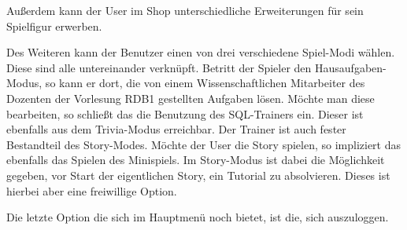 Au{\ss}erdem kann der User im Shop unterschiedliche Erweiterungen f\"ur sein Spielfigur erwerben.

Des Weiteren kann der Benutzer einen von drei verschiedene Spiel-Modi w\"ahlen. Diese sind alle untereinander verkn\"upft. Betritt der Spieler den 
Hausaufgaben-Modus, so kann er dort, die von einem Wissenschaftlichen Mitarbeiter des Dozenten der Vorlesung RDB1 gestellten Aufgaben l\"osen. 
M\"ochte man diese bearbeiten, so schlie{\ss}t das die Benutzung des SQL-Trainers ein. Dieser ist ebenfalls aus dem Trivia-Modus erreichbar. Der Trainer
ist auch fester Bestandteil des Story-Modes. M\"ochte der User die Story spielen, so impliziert das ebenfalls das Spielen des Minispiels.
Im Story-Modus ist dabei die M\"oglichkeit gegeben, vor Start der eigentlichen Story, ein Tutorial zu absolvieren. Dieses ist hierbei aber eine freiwillige Option.

Die letzte Option die sich im Hauptmen\"u noch bietet, ist die, sich auszuloggen.



